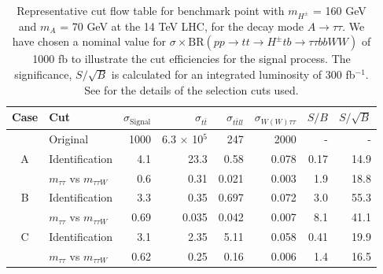 \begin{table}
\centering
\begin{adjustwidth*}{0in}{-0.8in}
\begin{tabular}{clrrrrrr}
  \toprule
  Case    & Cut                                & $\sigma_\text{Signal}$ & $\sigma_{t\bar{t}}$ & $\sigma_{t\bar{t}ll}$ & $\sigma_{W(W)\tau\tau}$ & $S/B$ & $S/\sqrt{B}$	\\\midrule
          & Original                           & 1000                   & 6.3 $\times$ 10$^5$ & 247                   & 2000                    & -     & - \\\midrule
  A       & Identification                     & 4.1                    & 23.3                & 0.58                  & 0.078                   & 0.17  & 14.9		\\
          & $m_{\tau\tau}$ vs $m_{\tau\tau W}$ & 0.6                    & 0.31                & 0.021                 & 0.003                   & 1.9   & 18.8		\\\midrule
  B       & Identification                     & 3.3                    & 0.35                & 0.697                 & 0.072                   & 3.0   & 55.3		\\
          & $m_{\tau\tau}$ vs $m_{\tau\tau W}$ & 0.69                   & 0.035               & 0.042                 & 0.007                   & 8.1   & 41.1		\\\midrule
  C       & Identification                     & 3.1                    & 2.35                & 5.11                  & 0.058                   & 0.41  & 19.9		\\
          & $m_{\tau\tau}$ vs $m_{\tau\tau W}$ & 0.62                   & 0.25                & 0.16                  & 0.006                   & 1.4   & 16.5		\\\midrule
\end{tabular}
\caption{Representative cut flow table for benchmark point with $m_{H^{\pm}}$ = 160 GeV and $m_A$ = 70 GeV at the 14 TeV LHC, for the decay mode $A\rightarrow\tau\tau$. We have chosen a nominal value for $\sigma \times \text{BR}(pp \rightarrow tt \rightarrow H^{\pm} tb \rightarrow \tau\tau bbWW)$ of 1000 fb to illustrate the cut efficiencies for the signal process. The significance, $S/\sqrt{B}$ is calculated for an integrated luminosity of 300 fb$^{-1}$. See \cite{Coleppa:2014cca} for the details of the selection cuts used.}
\label{tab:tt}
\end{adjustwidth*}
\end{table}

